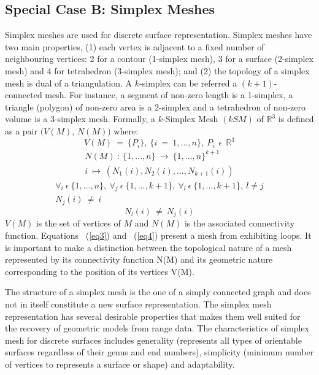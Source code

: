 \documentclass{InsightArticle}
\begin{document}
\subsection{Special Case B: Simplex Meshes}
Simplex meshes are used for discrete surface representation. Simplex meshes have two main properties, (1) each vertex is adjacent to a fixed number of neighbouring vertices: 2 for a contour (1-simplex mesh), 3 for a surface (2-simplex mesh) and 4 for tetrahedron (3-simplex mesh); and (2) the topology of a simplex mesh is dual of a triangulation. A $k$-simplex can be referred a $(k+1)$-connected mesh. For instance, a segment of non-zero length is a 1-simplex, a triangle (polygon) of non-zero area is a 2-simplex and a tetrahedron of non-zero volume is a 3-simplex mesh. Formally, a $k$-Simplex Mesh $(kSM)$ of $\mathbb{R}^3$ is defined as a pair $(V(M)$, $N(M))$ \cite{Delingette1994} where:
\begin{equation}
	V(M)~=~\{P_i\},~\{i~=~1,..., n\},~P_i\ ~\epsilon\  ~\mathbb{R}^3
	\label{eq1}
\end{equation}
\begin{equation}
	\begin{array}{c}
		N(M)~:~\{1,...,n\}~\longrightarrow~\{1,...,n\}^{k+1} \\
		i~\longmapsto~(N_1 (i), N_2 (i),...,N_{k+1} (i))
	\end{array}
	\label{eq2}
\end{equation}
\begin{equation}
	\begin{array}{c}
		\forall _i \ \epsilon \ \{1,...,n\},~\forall _j \ \epsilon \ \{1,...,k+1\},~\forall _l \ \epsilon \ \{1,...,k+1\}, \ l \neq j \\
		N_j (i)~\neq~i
	\end{array}
	\label{eq3}
\end{equation}
\begin{equation}
	N_l (i)~\neq~N_j (i)
	\label{eq4}
\end{equation}
$V(M)$ is the set of vertices of $M$ and $N(M)$ is the associated connectivity function. Equations ~(\ref{eq3}) and ~(\ref{eq4}) present a mesh from exhibiting loops. It is important to make a distinction between the topological nature of a mesh represented by its connectivity function N(M) and its geometric nature corresponding to the position of its vertices V(M). 

The structure of a simplex mesh is the one of a simply connected graph and does not in itself constitute a new surface representation. The simplex mesh representation has several desirable properties that makes them well suited for the recovery of geometric models from range data. The characteristics of simplex mesh for discrete surfaces includes generality (represents all types of orientable surfaces regardless of their genus and end numbers), simplicity (minimum number of vertices to represents a surface or shape) and adaptability.
\end{document}
